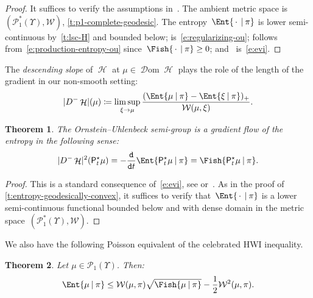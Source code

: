 \documentclass[10pt]{amsart}
\newtheorem{theorem}{Theorem}[section]
\theoremstyle{definition}
\theoremstyle{remark}
\DeclarePairedDelimiter{\paren}{\lparen}{\rparen}
\DeclarePairedDelimiter{\abs}{\lvert}{\rvert}
\newcommand{\given}[1][]{%
\nonscript\:#1\vert
\allowbreak
\nonscript\:
\mathopen{}}
\DeclareMathOperator{\ent}{\mathcal{H}}
\DeclareMathOperator{\dom}{\mathscr{D}om}
\newcommand{\emparg}{\,\cdot\,}
\begin{document}
\begin{proof}
It suffices to verify the assumptions in~\cite[Th.\,3.2]{DaneriSavare}.
The ambient metric space is $(\mathscr{P}_{1}^{*}(\varUpsilon),\mathcal{W})$, \cf \cref{t:p1-complete-geodesic}.
The entropy~$\Ent{\emparg \given\pi}$ is lower semi-continuous by~\cref{t:lsc-H} and bounded below;
\cite[Eq.\,(3.2a)]{DaneriSavare} is~\cref{e:regularizing-ou};
\cite[Eq.\,(3.2b)]{DaneriSavare} follows from~\cref{e:production-entropy-ou} since~$\Fish{\emparg\given\pi}\geq 0$; and~\cite[Eq.\,(3.2c)]{DaneriSavare} is~\cref{e:evi}.
\end{proof}

The \emph{descending slope} of $\ent$ at $\mu \in \dom \ent$ plays the role of the length of the gradient in our non-smooth setting:
\begin{equation*}
\abs{D^{-} \ent}(\mu) \coloneq \limsup_{\xi \to \mu} \frac{\paren{\Ent{ \mu \given \pi } - \Ent{ \xi \given \pi}}_{+}}{\mathcal{W}(\mu, \xi)}.
\end{equation*}

\begin{theorem}\label{t:ede}
The Ornstein--Uhlenbeck semi-group is a gradient flow of the entro\-py in the following sense:
\begin{equation*}
\abs{D^{-} \ent}^{2}(\mathsf{P}^{\star}_{t} \mu) = - \frac{\mathtt{d}}{\mathtt{d} t} \Ent{ \mathsf{P}^{\star}_{t} \mu \given \pi } = \Fish{ \mathsf{P}^{\star}_{t} \mu \given \pi }.
\end{equation*}
\end{theorem}

\begin{proof}
This is a standard consequence of~\cref{e:evi}, see \eg \cite[Prop.\,4.6]{AGUser} or~\cite[Eq.\,(3.17)]{MurSav20}.
As in the proof of \cref{t:entropy-geodesically-convex}, it suffices to verify that~$\Ent{\emparg\given\pi}$ is a lower semi-continuous functional bounded below and with dense domain in the metric space~$(\mathscr{P}_{1}^{*}(\varUpsilon),\mathcal{W})$.
\end{proof}

We also have the following Poisson equivalent of the celebrated HWI inequality.

\begin{theorem}\label{t:hwi}
Let $\mu \in \mathscr{P}_{1}(\varUpsilon)$.
Then:
\begin{equation*}
\Ent{ \mu \given \pi } \leq \mathcal{W}(\mu, \pi) \sqrt{\Fish{ \mu \given \pi }} - \frac{1}{2} \mathcal{W}^{2}(\mu, \pi).
\end{equation*}
\end{theorem}
\end{document}
